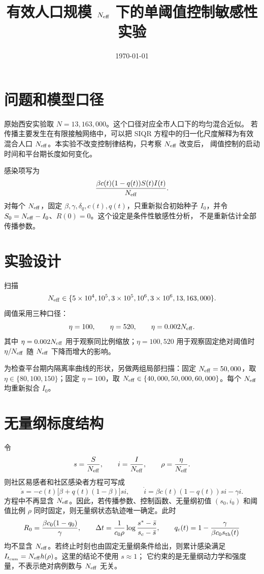 \documentclass[UTF8]{ctexart}
\title{有效人口规模 $N_{\rm eff}$ 下的单阈值控制敏感性实验}
\author{}
\date{\today}
\begin{document}
\maketitle

\section{问题和模型口径}
原始西安实验取 $N=13,163,000$。这个口径对应全市人口下的均匀混合近似。
若传播主要发生在有限接触网络中，可以把 SIQR 方程中的归一化尺度解释为有效混合人口
$N_{\rm eff}$。本实验不改变控制律结构，只考察 $N_{\rm eff}$ 改变后，
阈值控制的启动时间和平台期长度如何变化。

感染项写为
\[
\frac{\beta c(t)(1-q(t))S(t)I(t)}{N_{\rm eff}}.
\]
对每个 $N_{\rm eff}$，固定 $\beta,\gamma,\delta_q,c(t),q(t)$，只重新拟合初始种子
$I_0$，并令 $S_0=N_{\rm eff}-I_0$、$R(0)=0$。这个设定是条件性敏感性分析，
不是重新估计全部传播参数。

\section{实验设计}
扫描
\[
N_{\rm eff}\in\{5\times10^4,10^5,3\times10^5,10^6,3\times10^6,13,163,000\}.
\]
阈值采用三种口径：
\[
\eta=100,\qquad \eta=520,\qquad \eta=0.002N_{\rm eff}.
\]
其中 $\eta=0.002N_{\rm eff}$ 用于观察同比例缩放；$\eta=100,520$ 用于观察固定绝对阈值时
$\eta/N_{\rm eff}$ 随 $N_{\rm eff}$ 下降而增大的影响。

为检查平台期内隔离率曲线的形状，另做两组局部扫描：固定
$N_{\rm eff}=50,000$，取 $\eta\in\{80,100,150\}$；固定 $\eta=100$，取
$N_{\rm eff}\in\{40,000,50,000,60,000\}$。每个 $N_{\rm eff}$ 均重新拟合 $I_0$。

\section{无量纲标度结构}
令
\[
s=\frac{S}{N_{\rm eff}},\qquad
i=\frac{I}{N_{\rm eff}},\qquad
\rho=\frac{\eta}{N_{\rm eff}}.
\]
则社区易感者和社区感染者方程可写成
\[
\dot s=-c(t)\bigl[\beta+q(t)(1-\beta)\bigr]si,
\qquad
\dot i=\beta c(t)(1-q(t))si-\gamma i.
\]
方程中不再显含 $N_{\rm eff}$。因此，若传播参数、控制函数、无量纲初值
$(s_0,i_0)$ 和阈值比例 $\rho$ 同时固定，则无量纲状态轨迹唯一确定。此时
\[
R_0=\frac{\beta c_0(1-q_0)}{\gamma},
\qquad
\Delta t
=\frac{1}{c_0\rho}
\log\frac{s^*-\bar s}{s_c-\bar s},
\qquad
q_c(t)=1-\frac{\gamma}{\beta c_0s_{\rm th}(t)}
\]
均不显含 $N_{\rm eff}$。若终止时刻也由固定无量纲条件给出，则累计感染满足
$I_{t_{\rm cum}}=N_{\rm eff}h(\rho)$。这里的结论不使用 $s\approx1$；
它约束的是无量纲动力学和强度量，不表示绝对病例数与 $N_{\rm eff}$ 无关。
\end{document}
